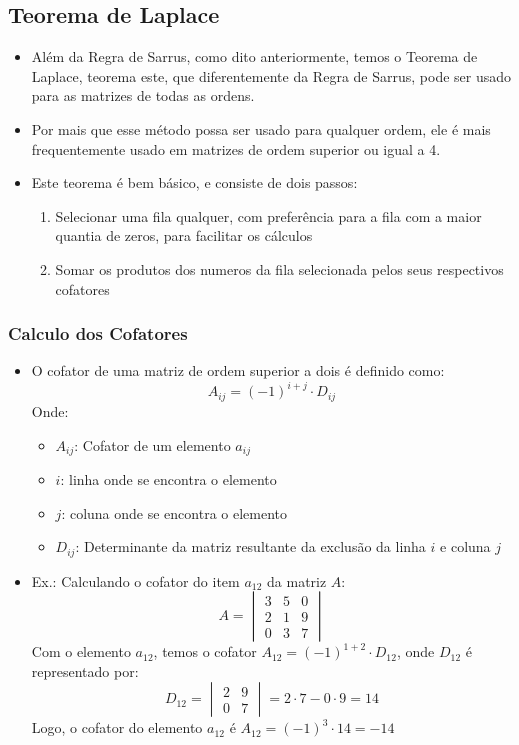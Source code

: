\documentclass[12pt]{article}
\begin{document}
    \subsection{Teorema de Laplace}
    \begin{itemize}
        \item Além da Regra de Sarrus, como dito anteriormente, temos o Teorema 
        de Laplace, teorema este, que diferentemente da Regra de Sarrus, pode 
        ser usado para as matrizes de todas as ordens.
        \item Por mais que esse método possa ser usado para qualquer ordem, 
        ele é mais frequentemente usado em matrizes de ordem superior ou igual 
        a 4.
        \item Este teorema é bem básico, e consiste de dois passos:
        \begin{enumerate}
            \item Selecionar uma fila qualquer, com preferência para a fila 
            com a maior quantia de zeros, para facilitar os cálculos
            \item Somar os produtos dos numeros da fila selecionada pelos seus 
            respectivos cofatores
        \end{enumerate}
    \end{itemize}
    \subsubsection{Calculo dos Cofatores}
    \begin{itemize}
        \item O cofator de uma matriz de ordem superior a dois é definido como:
        \[A_{ij}=(-1)^{i+j} \cdot D_{ij}\]
        Onde:
        \begin{itemize}
            \item $A_{ij}$: Cofator de um elemento $a_{ij}$
            \item $i$: linha onde se encontra o elemento
            \item $j$: coluna onde se encontra o elemento
            \item $D_{ij}$: Determinante da matriz resultante da exclusão da 
            linha $i$ e coluna $j$
        \end{itemize}
        \item Ex.: Calculando o cofator do item $a_{12}$ da matriz $A$:
        \[A =
        \begin{vmatrix}
            3 & 5 & 0 \\
            2 & 1 & 9 \\
            0 & 3 & 7 
        \end{vmatrix}
        \]
        Com o elemento $a_{12}$, temos o cofator $A_{12} = (-1)^{1+2} \cdot 
        D_{12}$, onde $D_{12}$ é representado por:
        \[
        D_{12} = 
        \begin{vmatrix}
            2 & 9 \\
            0 & 7
        \end{vmatrix}
        = 2\cdot7 - 0\cdot 9 = 14
        \]
        Logo, o cofator do elemento $a_{12}$ é $A_{12} = (-1)^3 \cdot 14 = -14$
    \end{itemize}
\end{document}
